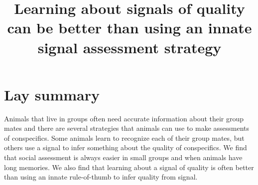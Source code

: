 




\noindent
\title{Learning about signals of quality can be better than using an innate signal assessment strategy} 
\author{}
\date{} 
\maketitle


\linenumbers

\section*{Lay summary}
Animals that live in groups often need accurate information about their group mates and there are several strategies that animals can use to make assessments of conspecifics. Some animals learn to recognize each of their group mates, but others use a signal to infer something about the quality of conspecifics. We find that social assessment is always easier in small groups and when animals have long memories. We also find that learning about a signal of quality is often better than using an innate rule-of-thumb to infer quality from signal.



